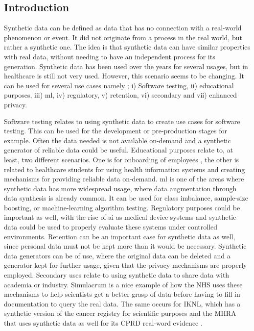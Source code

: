 
\subsection{Introduction}
Synthetic data can be defined as data that has no connection with a real-world phenomenon or event. It did not originate from a process in the real world, but rather a synthetic one. The idea is that synthetic data can have similar properties with real data, without needing to have an independent process for its generation.
Synthetic data has been used over the years for several usages, but in healthcare is still not very used. However, this scenario seems to be changing. It can be used for several use cases namely \cite{synthetic-data-usage}; i) Software testing, ii) educational purposes, iii) \ac{ml}, iv) regulatory, v) retention, vi) secondary and vii) enhanced privacy.

Software testing relates to using synthetic data to create use cases for software testing. This can be used for the development or pre-production stages for example. Often the data needed is not available on-demand and a synthetic generator of reliable data could be useful. Educational purposes relate to, at least, two different scenarios. One is for onboarding of employees \cite{synthetic-data-usage}, the other is related to healthcare students for using health information systems and creating mechanisms for providing reliable data on-demand.
\ac{ml} is one of the areas where synthetic data has more widespread usage, where data augmentation through data synthesis is already common. It can be used for class imbalance, sample-size boosting, or machine-learning algorithm testing. Regulatory purposes could be important as well, with the rise of \ac{ai} as medical device systems and synthetic data could be used to properly evaluate these systems under controlled environments. Retention can be an important case for synthetic data as well, since personal data must not be kept more than it would be necessary. Synthetic data generators can be of use, where the original data can be deleted and a generator kept for further usage, given that the privacy mechanisms are properly employed. Secondary uses relate to using synthetic data to share data with academia or industry. Simulacrum \cite{simulacrum} is a nice example of how the NHS uses these mechanisms to help scientists get a better grasp of data before having to fill in documentation to query the real data. The same occurs for \ac{IKNL}, which has a synthetic version of the cancer registry for scientific purposes \cite{synthetic_2} and the \ac{MHRA} that uses synthetic data as well for its CPRD real-word evidence \cite{mhra_cprd}.

